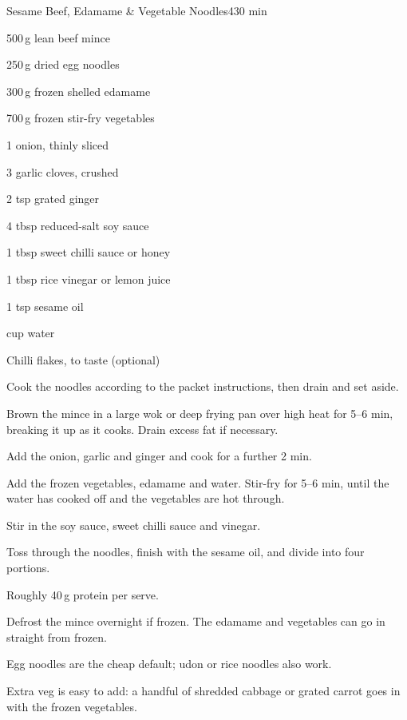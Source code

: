 \begin{recipebox}{Sesame Beef, Edamame \& Vegetable Noodles}{4}{30 min}

\begin{ingredients}
  \item 500\,g lean beef mince
  \item 250\,g dried egg noodles
  \item 300\,g frozen shelled edamame
  \item 700\,g frozen stir-fry vegetables
  \item 1 onion, thinly sliced
  \item 3 garlic cloves, crushed
  \item 2 tsp grated ginger
  \item 4 tbsp reduced-salt soy sauce
  \item 1 tbsp sweet chilli sauce or honey
  \item 1 tbsp rice vinegar or lemon juice
  \item 1 tsp sesame oil
  \item {} cup water
  \item Chilli flakes, to taste (optional)
\end{ingredients}

\begin{method}
  \item Cook the noodles according to the packet instructions, then drain and set aside.
  \item Brown the mince in a large wok or deep frying pan over high heat for 5--6 min, breaking it up as it cooks. Drain excess fat if necessary.
  \item Add the onion, garlic and ginger and cook for a further 2 min.
  \item Add the frozen vegetables, edamame and water. Stir-fry for 5--6 min, until the water has cooked off and the vegetables are hot through.
  \item Stir in the soy sauce, sweet chilli sauce and vinegar.
  \item Toss through the noodles, finish with the sesame oil, and divide into four portions.
\end{method}

\begin{notelist}
  \item Roughly 40\,g protein per serve.
  \item Defrost the mince overnight if frozen. The edamame and vegetables can go in straight from frozen.
  \item Egg noodles are the cheap default; udon or rice noodles also work.
  \item Extra veg is easy to add: a handful of shredded cabbage or grated carrot goes in with the frozen vegetables.
\end{notelist}

\end{recipebox}

